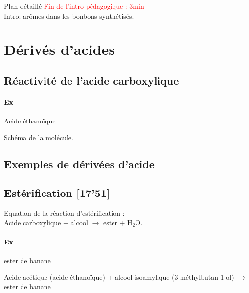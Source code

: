 \begin{reportBlock}{Plan détaillé}
\textcolor{red}{Fin de l'intro pédagogique : 3min} \\

Intro: arômes dans les bonbons synthétisés. 

\section{Dérivés d'acides}

\subsection{Réactivité de l'acide carboxylique}

\paragraph{Ex} Acide éthanoïque

Schéma de la molécule.


\subsection{Exemples de dérivées d'acide}




\subsection{Estérification [17'51]} 

Equation de la réaction d'estérification : \\
Acide carboxylique + alcool $\rightarrow$ ester + H$_2$O.

\paragraph{Ex} ester de banane

Acide acétique (acide éthanoïque) + alcool isoamylique (3-méthylbutan-1-ol) $\rightarrow$ ester de banane


\end{reportBlock}
